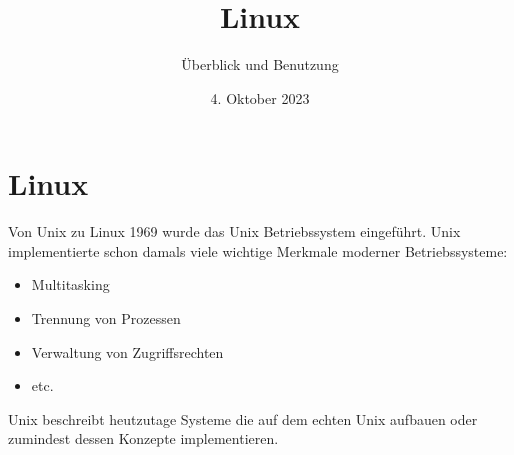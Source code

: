\documentclass{setbeamer}
\title{Linux}
\subtitle{Überblick und Benutzung}
\institute{\theChairName\\\theDepartmentName\\\theUniversityName}
\date[04.10.2023]{4. Oktober 2023}
\begin{document}
\maketitle

\section{Linux}

\begin{frame}{Von Unix zu Linux}
    1969 wurde das Unix Betriebssystem eingeführt. Unix implementierte schon damals viele wichtige Merkmale moderner Betriebssysteme:

    \begin{itemize}
        \item Multitasking
        \item Trennung von Prozessen
        \item Verwaltung von Zugriffsrechten
        \item etc.
    \end{itemize}

    \pause
    \vspace{0.3cm}

    Unix beschreibt heutzutage Systeme die auf dem echten Unix aufbauen oder zumindest dessen Konzepte implementieren.
\end{frame}
\end{document}
